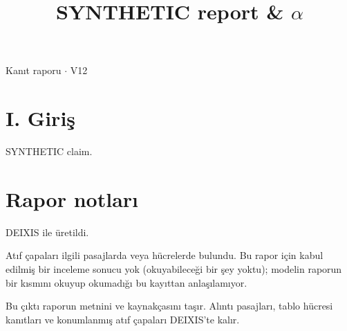 \documentclass[journal]{IEEEtran}
\begin{document}
\renewcommand{\abstractname}{Özet}
\renewcommand{\IEEEkeywordsname}{Dizin Terimleri}
\renewcommand{\refname}{Kaynaklar}

\title{SYNTHETIC report \& \ensuremath{\alpha}}

\maketitle

\noindent Kanıt raporu \ensuremath{\cdot} V12

\section*{I. Giriş}

SYNTHETIC claim. \cite{Synth26}

\section*{Rapor notları}

DEIXIS ile üretildi.

Atıf çapaları ilgili pasajlarda veya hücrelerde bulundu. Bu rapor için kabul edilmiş bir inceleme sonucu yok (okuyabileceği bir şey yoktu); modelin raporun bir kısmını okuyup okumadığı bu kayıttan anlaşılamıyor.

Bu çıktı raporun metnini ve kaynakçasını taşır. Alıntı pasajları, tablo hücresi kanıtları ve konumlanmış atıf çapaları DEIXIS'te kalır.




\end{document}
